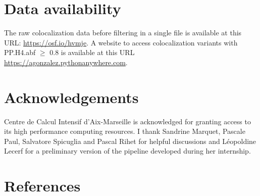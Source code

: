 \section*{Data availability}

The raw colocalization data before filtering in a single file is available at this URL: \url{https://osf.io/hvmje}.
%
A website to access colocalization variants with PP.H4.abf $\geq$ 0.8 is available at this URL \url{https://agonzalez.pythonanywhere.com}.

\section*{Acknowledgements}

Centre de Calcul Intensif d'Aix-Marseille is acknowledged for granting access to its high performance computing resources.
%
I thank Sandrine Marquet, Pascale Paul, Salvatore Spicuglia and Pascal Rihet for helpful discussions and L\'eopoldine Lecerf for a preliminary version of the pipeline developed during her internship.

\section*{References}




